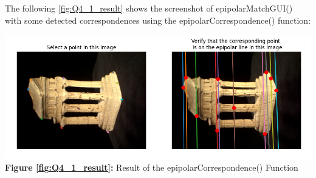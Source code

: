 \begin{your_solution}[title=Q4.1,height=9cm,width=\linewidth]
The following \autoref{fig:Q4_1_result} shows the screenshot of epipolarMatchGUI() with some detected correspondences using the epipolarCorrespondence() function:
\newline
\begin{minipage}{1\linewidth}
	\centering
	\includegraphics[width=1\linewidth, height=0.39\columnwidth]{../Q4_1_result.png}
	\textbf{Figure \ref{fig:Q4_1_result}:} Result of the epipolarCorrespondence() Function  %
	\label{fig:Q4_1_result}         %
\end{minipage}
\end{your_solution}
\newpage
